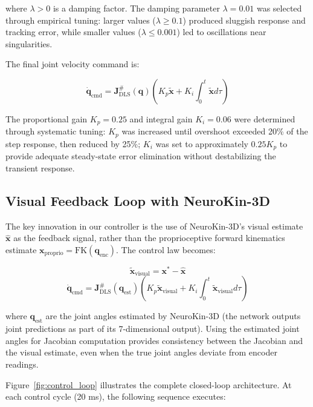 ﻿\documentclass[12pt,a4paper,oneside]{report}
\begin{document}
where $\lambda > 0$ is a damping factor. The damping parameter $\lambda = 0.01$ was selected through empirical tuning: larger values ($\lambda \geq 0.1$) produced sluggish response and tracking error, while smaller values ($\lambda \leq 0.001$) led to oscillations near singularities.

The final joint velocity command is:

\begin{equation}
\dot{\mathbf{q}}_{\text{cmd}} = \mathbf{J}^{\#}_{\text{DLS}}(\mathbf{q}) \left( K_p \tilde{\mathbf{x}} + K_i \int_0^t \tilde{\mathbf{x}} d\tau \right)
\end{equation}

The proportional gain $K_p = 0.25$ and integral gain $K_i = 0.06$ were determined through systematic tuning: $K_p$ was increased until overshoot exceeded 20\% of the step response, then reduced by 25\%; $K_i$ was set to approximately $0.25 K_p$ to provide adequate steady-state error elimination without destabilizing the transient response.

\subsection{Visual Feedback Loop with NeuroKin-3D}

The key innovation in our controller is the use of NeuroKin-3D's visual estimate $\hat{\mathbf{x}}$ as the feedback signal, rather than the proprioceptive forward kinematics estimate $\mathbf{x}_{\text{proprio}} = \text{FK}(\mathbf{q}_{\text{enc}})$. The control law becomes:

\begin{equation}
\tilde{\mathbf{x}}_{\text{visual}} = \mathbf{x}^* - \hat{\mathbf{x}}
\end{equation}
\begin{equation}
\dot{\mathbf{q}}_{\text{cmd}} = \mathbf{J}^{\#}_{\text{DLS}}(\mathbf{q}_{\text{est}}) \left( K_p \tilde{\mathbf{x}}_{\text{visual}} + K_i \int_0^t \tilde{\mathbf{x}}_{\text{visual}} d\tau \right)
\end{equation}

where $\mathbf{q}_{\text{est}}$ are the joint angles estimated by NeuroKin-3D (the network outputs joint predictions as part of its 7-dimensional output). Using the estimated joint angles for Jacobian computation provides consistency between the Jacobian and the visual estimate, even when the true joint angles deviate from encoder readings.

Figure~\ref{fig:control_loop} illustrates the complete closed-loop architecture. At each control cycle (20 ms), the following sequence executes:
\end{document}
